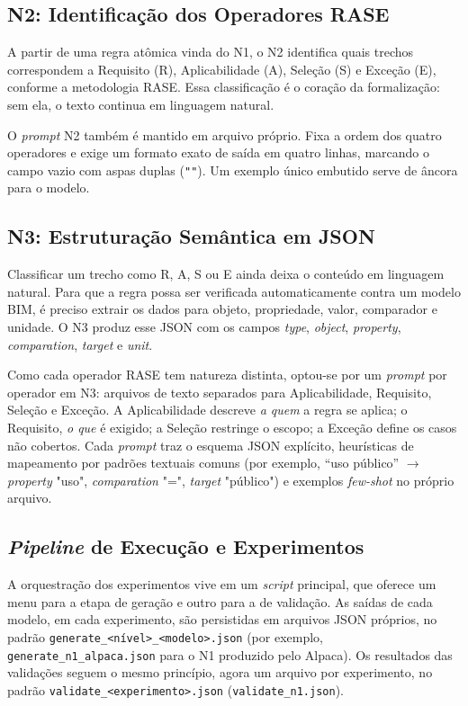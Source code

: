 \subsection{N2: Identificação dos Operadores RASE}

A partir de uma regra atômica vinda do N1, o N2 identifica quais trechos correspondem a Requisito (R), Aplicabilidade (A), Seleção (S) e Exceção (E), conforme a metodologia RASE. Essa classificação é o coração da formalização: sem ela, o texto continua em linguagem natural.

O \textit{prompt} N2 também é mantido em arquivo próprio. Fixa a ordem dos quatro operadores e exige um formato exato de saída em quatro linhas, marcando o campo vazio com aspas duplas (\verb|""|). Um exemplo único embutido serve de âncora para o modelo.

\subsection{N3: Estruturação Semântica em JSON}

Classificar um trecho como R, A, S ou E ainda deixa o conteúdo em linguagem natural. Para que a regra possa ser verificada automaticamente contra um modelo BIM, é preciso extrair os dados para objeto, propriedade, valor, comparador e unidade. O N3 produz esse JSON com os campos \textit{type}, \textit{object}, \textit{property}, \textit{comparation}, \textit{target} e \textit{unit}.

Como cada operador RASE tem natureza distinta, optou-se por um \textit{prompt} por operador em N3: arquivos de texto separados para Aplicabilidade, Requisito, Seleção e Exceção. A Aplicabilidade descreve \textit{a quem} a regra se aplica; o Requisito, \textit{o que} é exigido; a Seleção restringe o escopo; a Exceção define os casos não cobertos. Cada \textit{prompt} traz o esquema JSON explícito, heurísticas de mapeamento por padrões textuais comuns (por exemplo, ``uso público'' $\rightarrow$ \textit{property} "uso", \textit{comparation} "=", \textit{target} "público") e exemplos \textit{few-shot} no próprio arquivo.

\subsection{\textit{Pipeline} de Execução e Experimentos}

A orquestração dos experimentos vive em um \textit{script} principal, que oferece um menu para a etapa de geração e outro para a de validação. As saídas de cada modelo, em cada experimento, são persistidas em arquivos JSON próprios, no padrão \texttt{generate\_<nível>\_<modelo>.json} (por exemplo, \texttt{generate\_n1\_alpaca.json} para o N1 produzido pelo Alpaca). Os resultados das validações seguem o mesmo princípio, agora um arquivo por experimento, no padrão \texttt{validate\_<experimento>.json} (\texttt{validate\_n1.json}).

